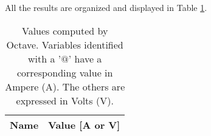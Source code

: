 All the results are organized and displayed in Table \ref{tab:oct}.


\begin{table}[h]
	\centering
	\begin{tabular}{|l|r|}
    		\hline    
    		{\bf Name} & {\bf Value [A or V]} \\ \hline
    		
  	\end{tabular}
  	\caption{Values computed by Octave. Variables identified with a '$@$' have a
  	corresponding value in Ampere (A). The others are expressed in Volts (V).}
 
\label{tab:oct}
\end{table}


